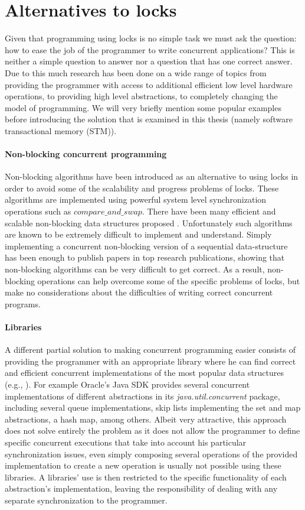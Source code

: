 \section{Alternatives to locks}
Given that programming using locks
is no simple task
we must ask the question:  how to  ease  the  job of  the programmer  to write
concurrent applications?
This is neither a simple question to answer nor a question that has one correct answer.
Due to this much research has been done on a wide range of topics from providing the programmer with access to additional
efficient low level hardware operations, to providing high level abstractions, to completely
changing the model of programming.
We will very briefly mention some popular examples before introducing the solution that is
examined in this thesis (namely software transactional memory (STM)).

\paragraph{Non-blocking concurrent programming}
Non-blocking algorithms \cite{GC96} have been introduced as an alternative to using
locks in order to avoid some of the scalability and progress problems of locks.
These algorithms are implemented using powerful system level synchronization operations such
as $compare\_and\_swap$.
There have been many efficient and scalable non-blocking data structures proposed
\cite{Mic02,ST04,Val96,FR04,Fra03}.
Unfortunately such algorithms are known to be extremely difficult to implement
and understand.
Simply implementing a concurrent non-blocking version of a sequential data-structure
has been enough to publish papers in top research publications, showing that
non-blocking algorithms can be very difficult to get correct.
As a result, non-blocking operations can help overcome some of the specific problems of locks,
but make no considerations about the difficulties of writing correct concurrent programs.


\paragraph{Libraries}
A different partial  solution to making concurrent programming easier consists of providing 
the programmer with an appropriate 
library where  he  can  find  correct  and  efficient concurrent implementations  of  
the most popular data structures (e.g., \cite{HS08,MS96}). 
For example Oracle's Java SDK \cite{javasdk} provides several concurrent implementations of different abstractions in its
\emph{java.util.concurrent} package, including several queue implementations,
skip lists \cite{Pug90} implementing the set and map abstractions, a hash map, among others.
Albeit very attractive, this approach does not solve entirely the problem  
as it does not allow the programmer to define  specific concurrent executions 
that take into account  his particular  synchronization issues,
even simply composing several operations of the provided implementation
to create a new operation is usually not possible using these libraries.
A libraries' use is then restricted to the specific functionality of each abstraction's implementation,
leaving the responsibility of dealing with any separate synchronization to the programmer.

